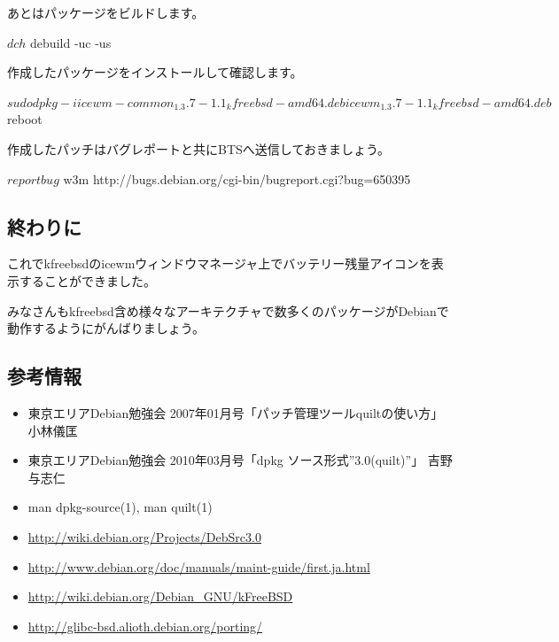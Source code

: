 \documentclass[mingoth,a4paper]{jsarticle}
\begin{document}
あとはパッケージをビルドします。

\begin{commandline}
$ dch
$ debuild -uc -us
\end{commandline}

作成したパッケージをインストールして確認します。
\begin{commandline}
$ sudo dpkg -i icewm-common_1.3.7-1.1_kfreebsd-amd64.deb icewm_1.3.7-1.1_kfreebsd-amd64.deb
$ reboot
\end{commandline}

作成したパッチはバグレポートと共にBTSへ送信しておきましょう。

\begin{commandline}
$ reportbug
$ w3m http://bugs.debian.org/cgi-bin/bugreport.cgi?bug=650395
\end{commandline}

\subsection{終わりに}
これでkfreebsdのicewmウィンドウマネージャ上でバッテリー残量アイコンを表示することができました。

みなさんもkfreebsd含め様々なアーキテクチャで数多くのパッケージがDebianで動作するようにがんばりましょう。

\subsection{参考情報}
\begin{itemize}
 \item{東京エリアDebian勉強会 2007年01月号「パッチ管理ツールquiltの使い方」小林儀匡}
 \item{東京エリアDebian勉強会 2010年03月号「dpkg ソース形式''3.0(quilt)''」 吉野与志仁}
 \item{man dpkg-source(1), man quilt(1)}
 \item{\url{http://wiki.debian.org/Projects/DebSrc3.0}}
 \item{\url{http://www.debian.org/doc/manuals/maint-guide/first.ja.html}}
 \item{\url{http://wiki.debian.org/Debian\_GNU/kFreeBSD}}
 \item{\url{http://glibc-bsd.alioth.debian.org/porting/}}
\end{itemize}
\end{document}
